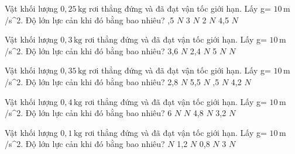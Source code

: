 \begin{ex}
Vật khối lượng $0,25\,\text{kg}$ rơi thẳng đứng và đã đạt vận tốc giới hạn. Lấy g= $10\,\text{m}$ /s^2. Độ lớn lực cản khi đó bằng bao nhiêu?
\choice
{,5 $N$}
{3 $N$}
{2 $N$}
{4,5 $N$}
\end{ex}

\begin{ex}
Vật khối lượng $0,3\,\text{kg}$ rơi thẳng đứng và đã đạt vận tốc giới hạn. Lấy g= $10\,\text{m}$ /s^2. Độ lớn lực cản khi đó bằng bao nhiêu?
\choice
{3,6 $N$}
{2,4 $N$}
{5 $N$}
{ $N$}
\end{ex}

\begin{ex}
Vật khối lượng $0,35\,\text{kg}$ rơi thẳng đứng và đã đạt vận tốc giới hạn. Lấy g= $10\,\text{m}$ /s^2. Độ lớn lực cản khi đó bằng bao nhiêu?
\choice
{2,8 $N$}
{5,5 $N$}
{,5 $N$}
{4,2 $N$}
\end{ex}

\begin{ex}
Vật khối lượng $0,4\,\text{kg}$ rơi thẳng đứng và đã đạt vận tốc giới hạn. Lấy g= $10\,\text{m}$ /s^2. Độ lớn lực cản khi đó bằng bao nhiêu?
\choice
{6 $N$}
{ $N$}
{4,8 $N$}
{3,2 $N$}
\end{ex}

\begin{ex}
Vật khối lượng $0,1\,\text{kg}$ rơi thẳng đứng và đã đạt vận tốc giới hạn. Lấy g= $10\,\text{m}$ /s^2. Độ lớn lực cản khi đó bằng bao nhiêu?
\choice
{ $N$}
{1,2 $N$}
{0,8 $N$}
{3 $N$}
\end{ex}

